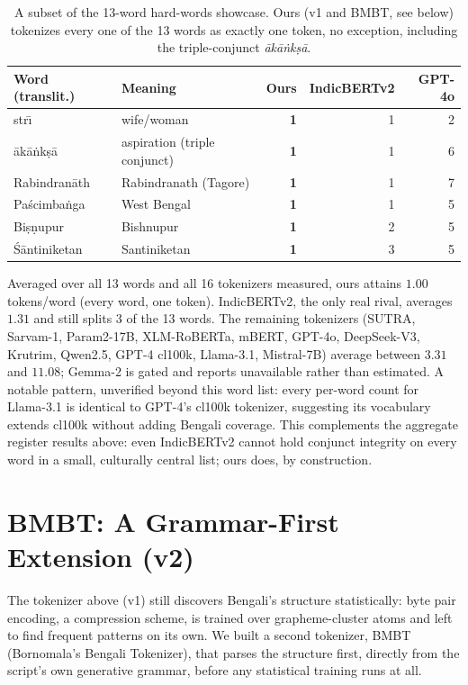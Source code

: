 \documentclass[11pt]{article}
\begin{document}
\begin{table}[t]
\centering
\small
\begin{tabular}{lp{3.3cm}rrr}
\toprule
Word (translit.) & Meaning & Ours & IndicBERTv2 & GPT-4o \\
\midrule
str\={\i} & wife/woman & \textbf{1} & 1 & 2 \\
\={a}k\={a}\.nk\d{s}\={a} & aspiration (triple conjunct) & \textbf{1} & 1 & 6 \\
Rabindran\={a}th & Rabindranath (Tagore) & \textbf{1} & 1 & 7 \\
Pa\'{s}cimba\.nga & West Bengal & \textbf{1} & 1 & 5 \\
Bi\d{s}\d{n}upur & Bishnupur & \textbf{1} & 2 & 5 \\
\'{S}\={a}ntiniketan & Santiniketan & \textbf{1} & 3 & 5 \\
\bottomrule
\end{tabular}
\caption{A subset of the 13-word hard-words showcase. Ours (v1 and BMBT,
see below) tokenizes every one of the 13 words as exactly one token, no
exception, including the triple-conjunct \emph{\={a}k\={a}\.nk\d{s}\={a}}.}
\label{tab:hardwords}
\end{table}

Averaged over all 13 words and all 16 tokenizers measured, ours attains
$1.00$ tokens/word (every word, one token). IndicBERTv2, the only real
rival, averages $1.31$ and still splits 3 of the 13 words. The remaining
tokenizers (SUTRA, Sarvam-1, Param2-17B, XLM-RoBERTa, mBERT, GPT-4o,
DeepSeek-V3, Krutrim, Qwen2.5, GPT-4 cl100k, Llama-3.1, Mistral-7B) average
between $3.31$ and $11.08$; Gemma-2 is gated and reports unavailable rather
than estimated. A notable pattern, unverified beyond this word list: every
per-word count for Llama-3.1 is identical to GPT-4's cl100k tokenizer,
suggesting its vocabulary extends cl100k without adding Bengali coverage.
This complements the aggregate register results above: even IndicBERTv2
cannot hold conjunct integrity on every word in a small, culturally
central list; ours does, by construction.

\section{BMBT: A Grammar-First Extension (v2)}
The tokenizer above (v1) still discovers Bengali's structure statistically:
byte pair encoding, a compression scheme, is trained over grapheme-cluster
atoms and left to find frequent patterns on its own. We built a second
tokenizer, BMBT (Bornomala's Bengali Tokenizer), that parses the structure
first, directly from the script's own generative grammar, before any
statistical training runs at all.
\end{document}
